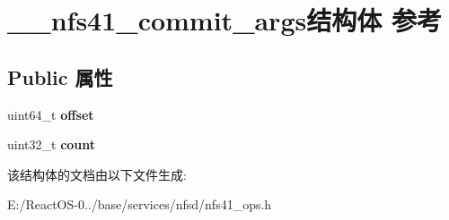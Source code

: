 \hypertarget{struct____nfs41__commit__args}{}\section{\+\_\+\+\_\+nfs41\+\_\+commit\+\_\+args结构体 参考}
\label{struct____nfs41__commit__args}
\subsection*{Public 属性}
\begin{DoxyCompactItemize}
\item 
\mbox{\label{struct____nfs41__commit__args_ad1961eba7af2e1b874d88f3f00fd278b}} 
uint64\+\_\+t {\bfseries offset}
\item 
\mbox{\label{struct____nfs41__commit__args_aa34c65bf11078db9bf40cf2eff520a9e}} 
uint32\+\_\+t {\bfseries count}
\end{DoxyCompactItemize}


该结构体的文档由以下文件生成\+:\begin{DoxyCompactItemize}
\item 
E\+:/\+React\+O\+S-\/0../base/services/nfsd/nfs41\+\_\+ops.\+h\end{DoxyCompactItemize}
